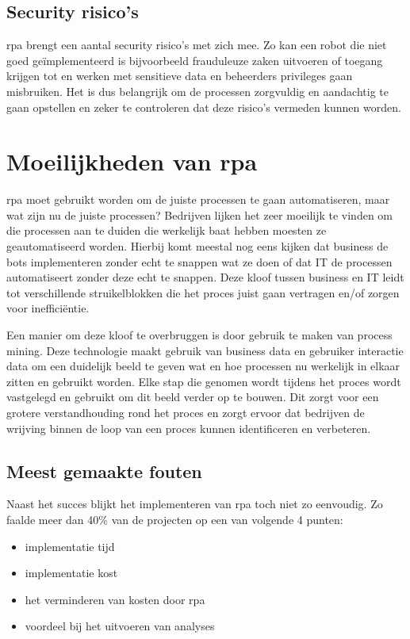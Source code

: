 \subsection{Security risico's}
\acrshort{rpa} brengt een aantal security risico's met zich mee. Zo kan een robot die niet goed geïmplementeerd is bijvoorbeeld frauduleuze zaken uitvoeren of toegang krijgen tot en werken met sensitieve data en beheerders privileges gaan misbruiken. Het is dus belangrijk om de processen zorgvuldig en aandachtig te gaan opstellen en zeker te controleren dat deze risico's vermeden kunnen worden. \autocite{everythingRPA} \autocite{predictionRPA}

\section{Moeilijkheden van \acrshort{rpa}}
\acrshort{rpa} moet gebruikt worden om de juiste processen te gaan automatiseren, maar wat zijn nu de juiste processen? Bedrijven lijken het zeer moeilijk te vinden om die processen aan te duiden die werkelijk baat hebben moesten ze geautomatiseerd worden. Hierbij komt meestal nog eens kijken dat business de bots implementeren zonder echt te snappen wat ze doen of dat IT de processen automatiseert zonder deze echt te snappen. Deze kloof tussen business en IT leidt tot verschillende struikelblokken die het proces juist gaan vertragen en/of zorgen voor inefficiëntie. \autocite{cFutRPA}

Een manier om deze kloof te overbruggen is door gebruik te maken van process mining. Deze technologie maakt gebruik van business data en gebruiker interactie data om een duidelijk beeld te geven wat en hoe processen nu werkelijk in elkaar zitten en gebruikt worden. Elke stap die genomen wordt tijdens het proces wordt vastgelegd en gebruikt om dit beeld verder op te bouwen. Dit zorgt voor een grotere verstandhouding rond het proces en zorgt ervoor dat bedrijven de wrijving binnen de loop van een proces kunnen identificeren en verbeteren. \autocite{cFutRPA}

\subsection{Meest gemaakte fouten}
Naast het succes blijkt het implementeren van \acrshort{rpa} toch niet zo eenvoudig. Zo faalde meer dan 40\% van de projecten op een van volgende 4 punten:
\begin{itemize}
	\item implementatie tijd
	\item implementatie kost
	\item het verminderen van kosten door \acrshort{rpa}
	\item voordeel bij het uitvoeren van analyses
\end{itemize}

